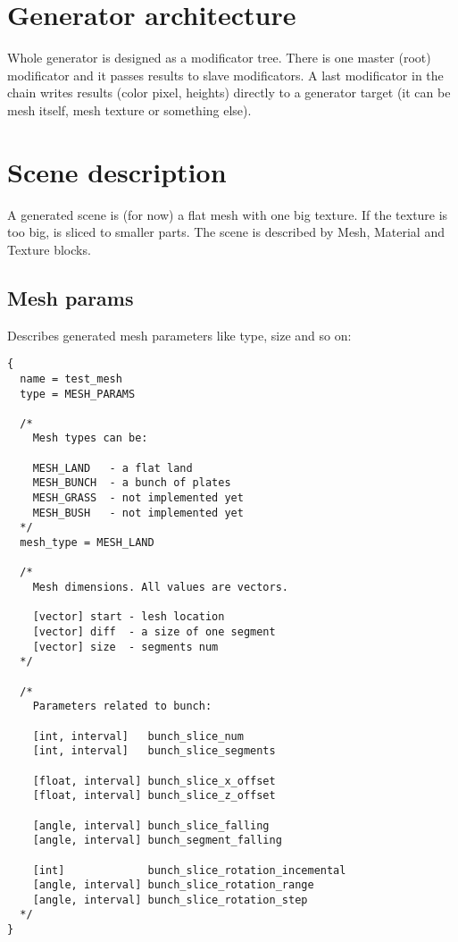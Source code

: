 \documentclass[11pt]{article}
\begin{document}
\section{Generator architecture}

Whole generator is designed as a modificator tree. There is one master (root)
modificator and it passes results to slave modificators. A last modificator 
in the chain writes results (color pixel, heights) directly to a generator target
(it can be mesh itself, mesh texture or something else).

\section{Scene description}

A generated scene is (for now) a flat mesh with one big texture. If the texture
is too big, is sliced to smaller parts. The scene is described by Mesh, 
Material and Texture blocks.

\subsection{Mesh params}

Describes generated mesh parameters like type, size and so on:

\begin{verbatim}
{
  name = test_mesh
  type = MESH_PARAMS

  /*
    Mesh types can be:
   
    MESH_LAND   - a flat land
    MESH_BUNCH  - a bunch of plates
    MESH_GRASS  - not implemented yet
    MESH_BUSH   - not implemented yet
  */
  mesh_type = MESH_LAND
  
  /*
    Mesh dimensions. All values are vectors.
  
    [vector] start - lesh location 
    [vector] diff  - a size of one segment 
    [vector] size  - segments num
  */  
    
  /*
    Parameters related to bunch:
    
    [int, interval]   bunch_slice_num
    [int, interval]   bunch_slice_segments
      
    [float, interval] bunch_slice_x_offset
    [float, interval] bunch_slice_z_offset
      
    [angle, interval] bunch_slice_falling
    [angle, interval] bunch_segment_falling
        
    [int]             bunch_slice_rotation_incemental
    [angle, interval] bunch_slice_rotation_range
    [angle, interval] bunch_slice_rotation_step
  */
}
\end{verbatim}
\end{document}
